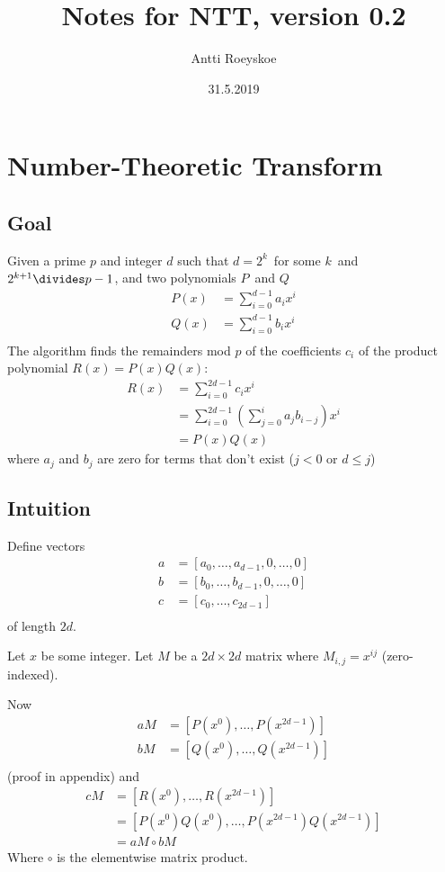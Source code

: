 \documentclass{article}
\title{Notes for NTT, version 0.2}
\author{Antti Roeyskoe}
\date{31.5.2019}
\begin{document}
\begin{titlepage}
\maketitle
\end{titlepage}

\newpage

\section{Number-Theoretic Transform}
\subsection{Goal}
Given a prime $p$ and integer $d$ such that $d = 2^{k}$ for some $k$ and $2^{k+1} \divides p-1$, and two polynomials $P$ and $Q$
\begin{align*}
P(x) &= \sum_{i = 0}^{d-1} a_{i} x^{i}\\
Q(x) &= \sum_{i = 0}^{d-1} b_{i} x^{i}\\
\end{align*}
The algorithm finds the remainders mod $p$ of the coefficients $c_{i}$ of the product polynomial $R(x) = P(x)Q(x)$:
\begin{align*}
R(x)		&= \sum_{i = 0}^{2d-1} c_{i} x^{i}\\
		&= \sum_{i = 0}^{2d-1} \left(\sum_{j = 0}^{i} a_{j}b_{i-j}\right) x^{i}\\
		&= P(x)Q(x)
\end{align*}
where $a_{j}$ and $b_{j}$ are zero for terms that don't exist ($j < 0$ or $d \leq j$)

\subsection{Intuition}
Define vectors
\begin{align*}
a &= [a_{0}, \dots, a_{d-1}, 0, \dots, 0]\\
b &= [b_{0}, \dots, b_{d-1}, 0, \dots, 0]\\
c &= [c_{0}, \dots, c_{2d-1}]\\
\end{align*}
of length $2d$.

Let $x$ be some integer. Let $M$ be a $2d \times 2d$ matrix where $M_{i,j} = x^{ij}$ (zero-indexed).

Now
\begin{align*}
aM	&= [P(x^{0}), \dots, P(x^{2d-1})]\\
bM	&= [Q(x^{0}), \dots, Q(x^{2d-1})]\\
\end{align*}
(proof in appendix) and
\begin{align*}
cM	&= [R(x^{0}), \dots, R(x^{2d-1})]\\
	&= [P(x^{0})Q(x^{0}), \dots, P(x^{2d-1})Q(x^{2d-1})]\\
	&= aM \circ bM
\end{align*}
Where $\circ$ is the elementwise matrix product.
\end{document}
